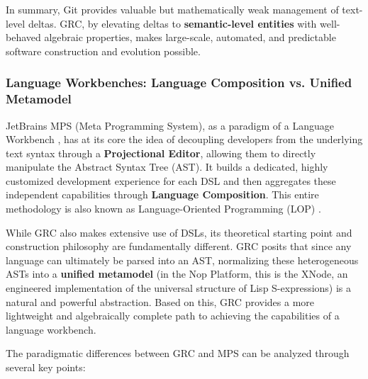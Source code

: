 \documentclass[11pt]{article}
\begin{document}
In summary, Git provides valuable but mathematically weak management of text-level deltas. GRC, by elevating deltas to \textbf{semantic-level entities} with well-behaved algebraic properties, makes large-scale, automated, and predictable software construction and evolution possible.

\subsubsection{Language Workbenches: Language Composition vs. Unified Metamodel}

JetBrains MPS (Meta Programming System), as a paradigm of a Language Workbench \cite{erdweg2013, fowler2005lw}, has at its core the idea of decoupling developers from the underlying text syntax through a \textbf{Projectional Editor}, allowing them to directly manipulate the Abstract Syntax Tree (AST). It builds a dedicated, highly customized development experience for each DSL and then aggregates these independent capabilities through \textbf{Language Composition}. This entire methodology is also known as Language-Oriented Programming (LOP) \cite{dmitriev2004}.

While GRC also makes extensive use of DSLs, its theoretical starting point and construction philosophy are fundamentally different. GRC posits that since any language can ultimately be parsed into an AST, normalizing these heterogeneous ASTs into a \textbf{unified metamodel} (in the Nop Platform, this is the XNode, an engineered implementation of the universal structure of Lisp S-expressions) is a natural and powerful abstraction. Based on this, GRC provides a more lightweight and algebraically complete path to achieving the capabilities of a language workbench.

The paradigmatic differences between GRC and MPS can be analyzed through several key points:
\end{document}
